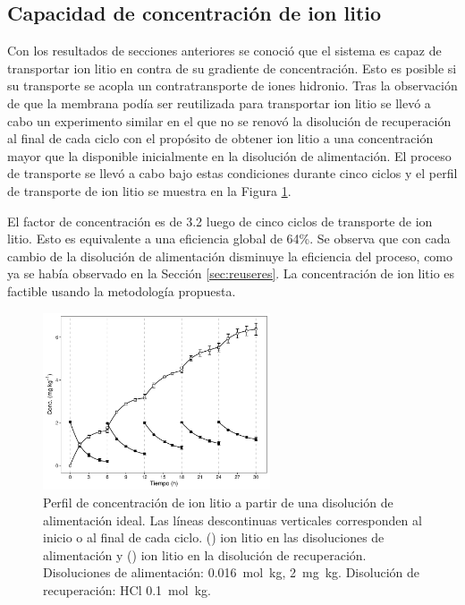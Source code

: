 \subsection{Capacidad de concentración de ion litio}\label{sec:idealconc}
Con los resultados de secciones anteriores se conoció que el sistema es capaz de transportar ion litio en contra de su gradiente de concentración. Esto es posible si su transporte se acopla un contratransporte de iones hidronio. Tras la observación de que la membrana podía ser reutilizada para transportar ion litio se llevó a cabo un experimento similar en el que no se renovó la disolución de recuperación al final de cada ciclo con el propósito de obtener ion litio a una concentración mayor que la disponible inicialmente en la disolución de alimentación. El proceso de transporte se llevó a cabo bajo estas condiciones durante cinco ciclos y el perfil de transporte de ion litio se muestra en la Figura \ref{fig:liconc1}. 

El factor de concentración es de 3.2 luego de cinco ciclos de transporte de ion litio. Esto es equivalente a una eficiencia global de 64\%. Se observa que con cada cambio de la disolución de alimentación disminuye la eficiencia del proceso, como ya se había observado en la Sección \ref{sec:reuseres}. La concentración de ion litio es factible usando la metodología propuesta.

\begin{figure}[H]
    \centering
    \includegraphics[width = 0.6\textwidth]{chap5/figures/liconc_0.pdf}
    \caption[Concentración de ion litio a partir de una disolución de alimentación ideal.]{Perfil de concentración de ion litio a partir de una disolución de alimentación ideal. Las líneas descontinuas verticales corresponden al inicio o al final de cada ciclo. (\protect\squareblck) ion litio en las disoluciones de alimentación y (\protect\squarewht) ion litio en la disolución de recuperación. Disoluciones de alimentación:  0.016~mol~kg\mnn,  2~mg~kg\mnn. Disolución de recuperación: HCl 0.1~mol~kg\mnn.}
    \label{fig:liconc1}
\end{figure}


